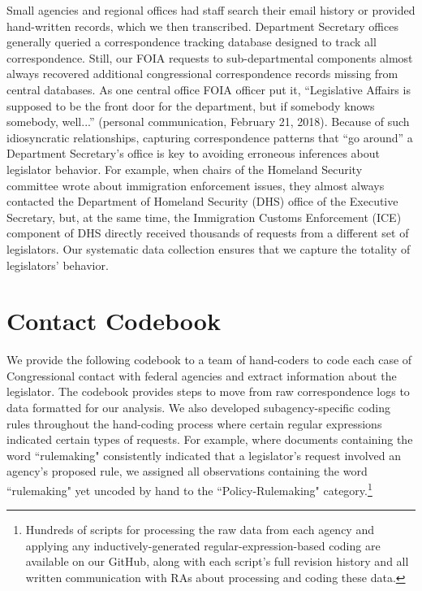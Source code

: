 Small agencies and regional offices had staff search their email history or provided hand-written records, which we then transcribed. Department Secretary offices generally queried a correspondence tracking database designed to track all correspondence. Still, our FOIA requests to sub-departmental components almost always recovered additional congressional correspondence records missing from central databases. As one central office FOIA officer put it, ``Legislative Affairs is supposed to be the front door for the department, but if somebody knows somebody, well...'' (personal communication, February 21, 2018). Because of such idiosyncratic relationships, capturing correspondence patterns that ``go around'' a Department Secretary's office is key to avoiding erroneous inferences about legislator behavior. For example, when chairs of the Homeland Security committee wrote about immigration enforcement issues, they almost always contacted the Department of Homeland Security (DHS) office of the Executive Secretary, but, at the same time, the Immigration Customs Enforcement (ICE) component of DHS directly received thousands of requests from a different set of legislators. Our systematic data collection ensures that we capture the totality of legislators' behavior.

%





\section{Contact Codebook} \label{a:codebook}
\singlespacing

We provide the following codebook to a team of hand-coders to code each case of Congressional contact with federal agencies and extract information about the legislator. The codebook provides steps to move from raw correspondence logs to data formatted for our analysis.  We also developed subagency-specific coding rules throughout the hand-coding process where certain regular expressions indicated certain types of requests. For example, where documents containing the word ``rulemaking" consistently indicated that a legislator's request involved an agency's proposed rule, we assigned all observations containing the word ``rulemaking" yet uncoded by hand to the ``Policy-Rulemaking" category.\footnote{Hundreds of scripts for processing the raw data from each agency and applying any inductively-generated regular-expression-based coding are available on our GitHub, along with each script's full revision history and all written communication with RAs about processing and coding these data.}


